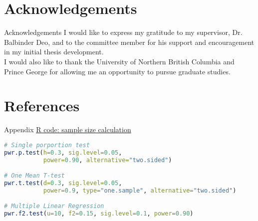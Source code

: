 \documentclass{beamer}\usepackage[]{graphicx}\usepackage[]{xcolor}
\renewcommand*{\bibfont}{\tiny}
\begin{document}
\section{Acknowledgements}
\begin{frame}{Acknowledgements}
I would like to express my gratitude to my supervisor, Dr. Balbinder Deo, and to the committee member for his support and encouragement in my initial thesis development.\\ 
I would also like to thank the University of Northern British Columbia and Prince George for allowing me an opportunity to pursue graduate studies.
\end{frame}


\section{References}
\begin{frame}[allowframebreaks]

    \bibfont
    \printbibliography
\end{frame}

\appendix
\begin{frame}[fragile]{Appendix}
    \underline{R code: sample size calculation}
    \fontsize{6pt}{6pt}\selectfont
    \begin{lstlisting}[language=R]
# Single porportion test
pwr.p.test(h=0.3, sig.level=0.05, 
           power=0.90, alternative="two.sided")

# One Mean T-test
pwr.t.test(d=0.3, sig.level=0.05,
           power=0.9, type="one.sample", alternative="two.sided")

# Multiple Linear Regression
pwr.f2.test(u=10, f2=0.15, sig.level=0.1, power=0.90)
    \end{lstlisting}
\end{frame}
\end{document}
